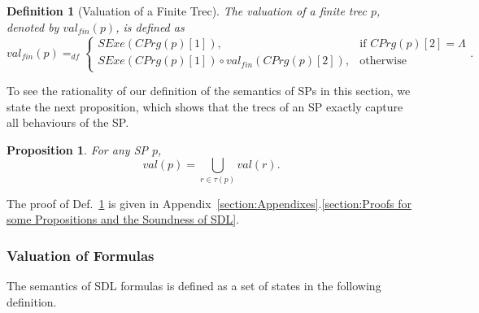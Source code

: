 \documentclass{fcs}
\newtheorem{mydef}{Definition}[section]
\newtheorem{prop}{Proposition}[section]
\newcommand{\val}[0]{\mathit{val}}
\newcommand{\CEvt}[0]{\mathit{CPrg}}
\newcommand{\none}[0]{\Lambda}
\newcommand{\SE}[0]{\mathit{SExe}}
\newcommand{\dddef}[0]{=_{df}}
\begin{document}
\begin{mydef}[Valuation of a Finite Trec]
	The valuation of a finite trec $p$, denoted by $\val_{\mathit{fin}}(p)$, is defined as
	$$\val_{\mathit{fin}}(p)\dddef \left\{\begin{array}{ll}
	\SE(\CEvt(p)[1]), &\mbox{if $\CEvt(p)[2] = \none$}\\
	\SE(\CEvt(p)[1])\circ \val_{\mathit{fin}}(\CEvt(p)[2]),  &\mbox{otherwise}
	\end{array}
	\right.. $$

\end{mydef}
\fi

To see the rationality of our definition of the semantics of SPs in this section, we state the next proposition, which shows that the trecs of an SP exactly capture
all behaviours of the SP.

\begin{prop}
    \label{prop:trecs property}
    For any SP $p$, $$\val(p) = \bigcup_{r\in \tau(p)}\val(r).$$
\end{prop}

The proof of Def.~\ref{prop:trecs property} is given in Appendix~\ref{section:Appendixes}.\ref{section:Proofs for some Propositions and the Soundness of SDL}.

\subsubsection{Valuation of Formulas}
\label{section:Valuation of Formulas}


The semantics of SDL formulas is defined as a set of states in the following definition.
\end{document}
